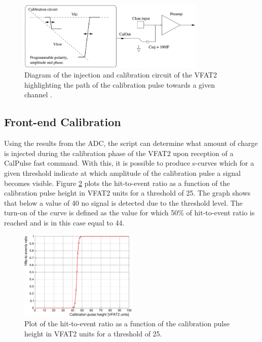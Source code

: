       \begin{figure}[h!]
        \centering
        \includegraphics[width=0.8\textwidth]{img/II-5-qualification/injection.png}
        \caption{Diagram of the injection and calibration circuit of the VFAT2 highlighting the path of the calibration pulse towards a given channel \cite{Aspell:1267947}.}
        \label{fig:II-5-injection}
      \end{figure}

    \subsection{Front-end Calibration}

      Using the results from the ADC, the script can determine what amount of charge is injected during the calibration phase of the VFAT2 upon reception of a CalPulse fast command. With this, it is possible to produce s-curves which for a given threshold indicate at which amplitude of the calibration pulse a signal becomes visible. Figure \ref{fig:II-5-scurve} plots the hit-to-event ratio as a function of the calibration pulse height in VFAT2 units for a threshold of 25. The graph shows that below a value of 40 no signal is detected due to the threshold level. The turn-on of the curve is defined as the value for which 50\% of hit-to-event ratio is reached and is in this case equal to 44. \\

      \begin{figure}[h!]
        \centering
        \includegraphics[width=0.5\textwidth]{img/plots/cSCurve_T25-crop}
        \caption{Plot of the hit-to-event ratio as a function of the calibration pulse height in VFAT2 units for a threshold of 25.}
        \label{fig:II-5-scurve}
      \end{figure}

